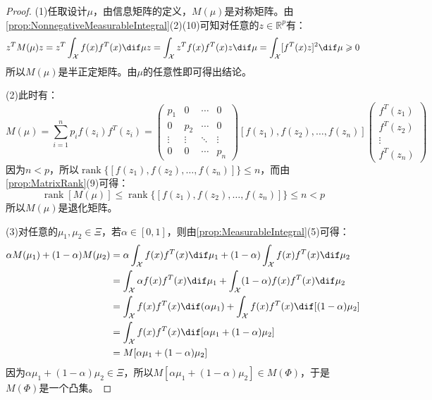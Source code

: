 \begin{proof}
	(1)任取设计$\mu$，由信息矩阵的定义，$M(\mu)$是对称矩阵。由\cref{prop:NonnegativeMeasurableIntegral}(2)(10)可知对任意的$z\in\mathbb{R}^{p}$有：
	\begin{equation*}
		z^TM(\mu)z=z^T\int_{\mathcal{X}}f(x)f^T(x)\dif\mu z=\int_{\mathcal{X}}z^Tf(x)f^T(x)z\dif\mu=\int_{\mathcal{X}}[f^T(x)z]^2\dif\mu\geqslant0
	\end{equation*}
	所以$M(\mu)$是半正定矩阵。由$\mu$的任意性即可得出结论。\par
	(2)此时有：
	\begin{equation*}
		M(\mu)=\sum_{i=1}^{n}p_if(z_i)f^T(z_i)=
		\begin{pmatrix}
			p_1 & 0 & \cdots & 0 \\
			0 & p_2 & \cdots & 0 \\
			\vdots & \vdots & \ddots & \vdots \\
			0 & 0 & \cdots & p_n 
		\end{pmatrix}
		[f(z_1),f(z_2),\dots,f(z_n)]
		\begin{pmatrix}
			f^T(z_1) \\
			f^T(z_2) \\
			\vdots \\
			f^T(z_n)
		\end{pmatrix}
	\end{equation*}
	因为$n<p$，所以$\operatorname{rank}\{[f(z_1),f(z_2),\dots,f(z_n)]\}\leqslant n$，而由\cref{prop:MatrixRank}(9)可得：
	\begin{equation*}
		\operatorname{rank}[M(\mu)]\leqslant\operatorname{rank}\{[f(z_1),f(z_2),\dots,f(z_n)]\}\leqslant n<p
	\end{equation*}
	所以$M(\mu)$是退化矩阵。\par
	(3)对任意的$\mu_1,\mu_2\in\Xi$，若$\alpha\in[0,1]$，则由\cref{prop:MeasurableIntegral}(5)可得：
	\begin{align*}
		\alpha M(\mu_1)+(1-\alpha)M(\mu_2)&=\alpha\int_{\mathcal{X}}f(x)f^T(x)\dif\mu_1+(1-\alpha)\int_{\mathcal{X}}f(x)f^T(x)\dif\mu_2 \\
		&=\int_{\mathcal{X}}\alpha f(x)f^T(x)\dif\mu_1+\int_{\mathcal{X}}(1-\alpha)f(x)f^T(x)\dif\mu_2 \\
		&=\int_{\mathcal{X}}f(x)f^T(x)\dif(\alpha\mu_1)+\int_{\mathcal{X}}f(x)f^T(x)\dif[(1-\alpha)\mu_2] \\
		&=\int_{\mathcal{X}}f(x)f^T(x)\dif[\alpha\mu_1+(1-\alpha)\mu_2] \\
		&=M[\alpha\mu_1+(1-\alpha)\mu_2]
	\end{align*}
	因为$\alpha\mu_1+(1-\alpha)\mu_2\in\Xi$，所以$M[\alpha\mu_1+(1-\alpha)\mu_2]\in M(\Phi)$，于是$M(\Phi)$是一个凸集。\par
\end{proof}
